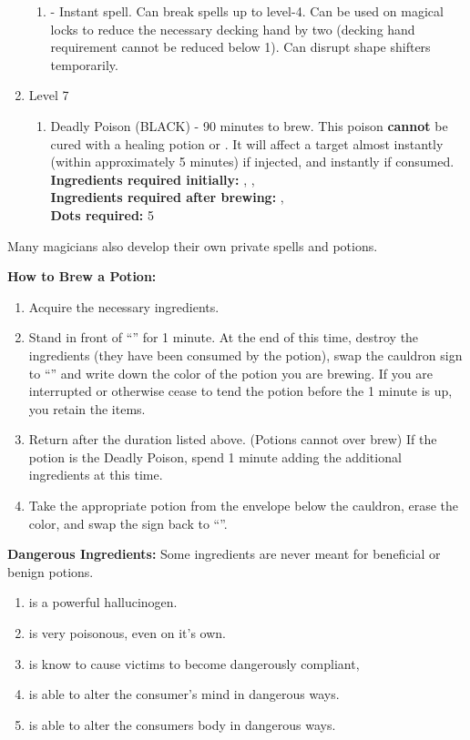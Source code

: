 \documentclass[green]{NeptuneBall}
\begin{document}
\begin{enumerate}
    \begin{enumerate}
      \item \aGreaterDispel{} - Instant spell. Can break spells up to level-4. Can be used on magical locks to reduce the necessary decking hand by two (decking hand requirement cannot be reduced below 1). Can disrupt shape shifters temporarily.
    \end{enumerate}
   \item Level 7
    \begin{enumerate}
      \item Deadly Poison (BLACK) - 90 minutes to brew. This poison {\bf cannot} be cured with a healing potion or \aFirstAid{}. It will affect a target almost instantly (within approximately 5 minutes) if injected, and instantly if consumed.\\
      {\bf Ingredients required initially:} \iIceFish{}, \iElectricEel{}, \iSwordfish{}\\
      {\bf Ingredients required after brewing:} \iSnails{}, \iDeepClam{}\\
		  {\bf Dots required:} 5
    \end{enumerate}
\end{enumerate}
Many magicians also develop their own private spells and potions.

{\bf How to Brew a Potion:}\\ %
\begin{enumerate}
  \item Acquire the necessary ingredients.
  \item Stand in front of ``\sEmptyCauldron{}'' for 1 minute. At the end of this time, destroy the ingredients (they have been consumed by the potion), swap the cauldron sign to ``\sFullCauldron{}'' and write down the color of the potion you are brewing. If you are interrupted or otherwise cease to tend the potion before the 1 minute is up, you retain the items.
  \item Return after the duration listed above. (Potions cannot over brew) If the potion is the Deadly Poison, spend 1 minute adding the additional ingredients at this time.
  \item Take the appropriate potion from the envelope below the cauldron, erase the color, and swap the sign back to ``\sEmptyCauldron{}''.
\end{enumerate}


{\bf Dangerous Ingredients:}
Some ingredients are never meant for beneficial or benign potions. 
\begin{enumerate}
\item \iHemlock{} is a powerful hallucinogen.  %
\item \iSnails{} is very poisonous, even on it's own. %
\item \iPearl{} is  know to cause victims to become dangerously compliant, %
\item \iManOfWar{} is able to alter the consumer's mind in dangerous ways. %
\item \iSquid{} is able to alter the consumers body in dangerous ways.  %
\end{enumerate}
\end{document}
